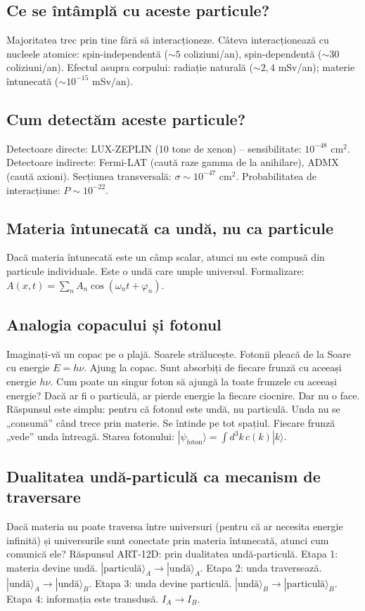\documentclass[11pt,a4paper]{article}
\begin{document}
\subsection{Ce se întâmplă cu aceste particule?}
Majoritatea trec prin tine fără să interacționeze. Câteva interacționează cu nucleele atomice: spin-independentă ($\sim 5$ coliziuni/an), spin-dependentă ($\sim 30$ coliziuni/an). Efectul asupra corpului: radiație naturală ($\sim 2,4$ mSv/an); materie întunecată ($\sim 10^{-15}$ mSv/an).

\subsection{Cum detectăm aceste particule?}
Detectoare directe: LUX-ZEPLIN (10 tone de xenon) – sensibilitate: $10^{-48}$ cm$^2$. Detectoare indirecte: Fermi-LAT (caută raze gamma de la anihilare), ADMX (caută axioni). Secțiunea transversală: $\sigma \sim 10^{-47}$ cm$^2$. Probabilitatea de interacțiune: $P \sim 10^{-22}$.

\subsection{Materia întunecată ca undă, nu ca particule}
Dacă materia întunecată este un câmp scalar, atunci nu este compusă din particule individuale. Este o undă care umple universul. Formalizare: $A(x,t) = \sum_n A_n \cos(\omega_n t + \varphi_n)$.

\subsection{Analogia copacului și fotonul}
Imaginați-vă un copac pe o plajă. Soarele strălucește. Fotonii pleacă de la Soare cu energie $E = h\nu$. Ajung la copac. Sunt absorbiți de fiecare frunză cu aceeași energie $h\nu$. Cum poate un singur foton să ajungă la toate frunzele cu aceeași energie? Dacă ar fi o particulă, ar pierde energie la fiecare ciocnire. Dar nu o face. Răspunsul este simplu: pentru că fotonul este undă, nu particulă. Unda nu se „consumă” când trece prin materie. Se întinde pe tot spațiul. Fiecare frunză „vede” unda întreagă. Starea fotonului: $|\psi_{\text{foton}}\rangle = \int d^3k \, c(k) |k\rangle$.

\subsection{Dualitatea undă-particulă ca mecanism de traversare}
Dacă materia nu poate traversa între universuri (pentru că ar necesita energie infinită) și universurile sunt conectate prin materia întunecată, atunci cum comunică ele? Răspunsul ART-12D: prin dualitatea undă-particulă. Etapa 1: materia devine undă. $|\text{particulă}\rangle_A \to |\text{undă}\rangle_A$. Etapa 2: unda traversează. $|\text{undă}\rangle_A \to |\text{undă}\rangle_B$. Etapa 3: unda devine particulă. $|\text{undă}\rangle_B \to |\text{particulă}\rangle_B$. Etapa 4: informația este transdusă. $I_A \to I_B$.
\end{document}
